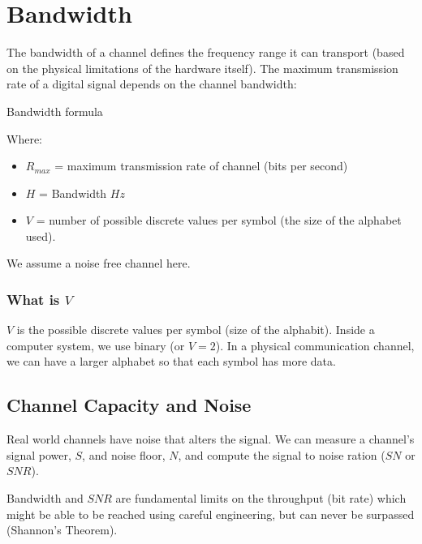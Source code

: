 \section{Bandwidth}\label{sec:bandwidth}

The bandwidth of a channel defines the frequency range it can transport (based on the physical limitations of the hardware itself).
The maximum transmission rate of a digital signal depends on the channel bandwidth:

\smallskip
\begin{highlight}{Bandwidth formula}
	\begin{minipage}{0.50\linewidth}
		\centering
	\end{minipage}
	\hfill
	\begin{minipage}{0.45\linewidth}
		Where:
		\begin{itemize}
			\item \( R_{max} \) = maximum transmission rate of channel (bits per second)
			\item \(H\) = Bandwidth \(Hz\)
			\item \(V\) = number of possible discrete values per symbol (the size of the alphabet used).
		\end{itemize}
	\end{minipage}
\end{highlight}
\begin{note}
	We assume a noise free channel here.
\end{note}

\subsubsection{What is \(V\)}\label{ssub:what_is_mk}

\(V\) is the possible discrete values per symbol (size of the alphabit).
Inside a computer system, we use binary (or \(V=2\)).
In a physical communication channel, we can have a larger alphabet so that each symbol has more data.

\subsection{Channel Capacity and Noise}\label{sub:channel_capacity_and_noise}

Real world channels have noise that alters the signal.
We can measure a channel's signal power, \(S\), and noise floor, \(N\), and compute the signal to noise ration (\(SN\) or \(SNR\)).

Bandwidth and \(SNR\) are fundamental limits on the throughput (bit rate) which might be able to be reached using careful engineering, but can never be surpassed (Shannon's Theorem).





